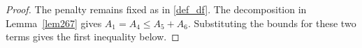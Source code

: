 \documentclass[twoside,11pt]{article}
\newcommand{\rev}[1]{{\color{revisionred}#1}}
\begin{document}
\begin{proof}
\rev{The penalty remains fixed as in \eqref{def_df}. The decomposition in Lemma~\ref{lem267} gives $A_1=A_4\leq A_5+A_6$. Substituting the bounds for these two terms gives the first inequality below.}





\end{proof}
\end{document}
